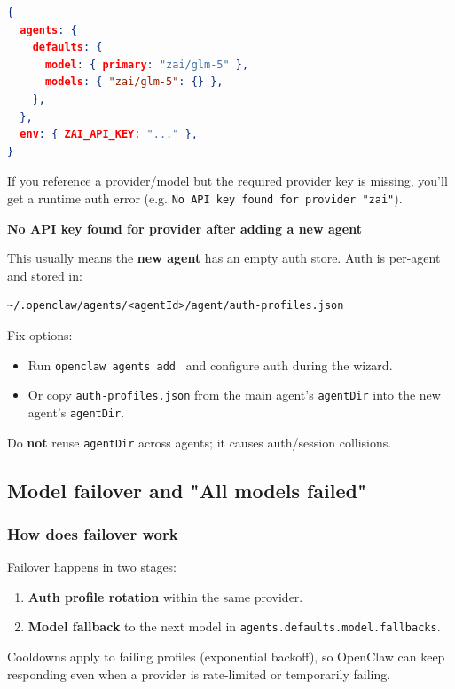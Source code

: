 \begin{lstlisting}[language=json]
{
  agents: {
    defaults: {
      model: { primary: "zai/glm-5" },
      models: { "zai/glm-5": {} },
    },
  },
  env: { ZAI_API_KEY: "..." },
}
\end{lstlisting}


If you reference a provider/model but the required provider key is missing, you'll get a runtime auth error (e.g. \texttt{No API key found for provider "zai"}).

\textbf{No API key found for provider after adding a new agent}

This usually means the \textbf{new agent} has an empty auth store. Auth is per-agent and
stored in:

\begin{lstlisting}
~/.openclaw/agents/<agentId>/agent/auth-profiles.json
\end{lstlisting}


Fix options:

\begin{itemize}
  \item Run \texttt{openclaw agents add } and configure auth during the wizard.
  \item Or copy \texttt{auth-profiles.json} from the main agent's \texttt{agentDir} into the new agent's \texttt{agentDir}.
\end{itemize}


Do \textbf{not} reuse \texttt{agentDir} across agents; it causes auth/session collisions.

\subsection{Model failover and "All models failed"}


\subsubsection{How does failover work}


Failover happens in two stages:

\begin{enumerate}
  \item \textbf{Auth profile rotation} within the same provider.
  \item \textbf{Model fallback} to the next model in \texttt{agents.defaults.model.fallbacks}.
\end{enumerate}


Cooldowns apply to failing profiles (exponential backoff), so OpenClaw can keep responding even when a provider is rate-limited or temporarily failing.

